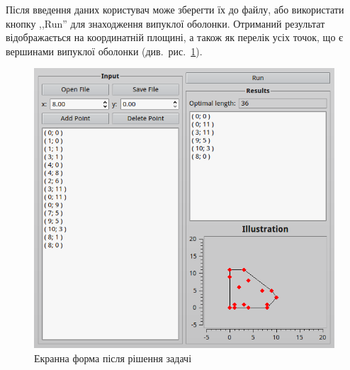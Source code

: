 \documentclass[simple,14pt,utf8,ukrainian]{eskdtext}
\begin{document}
    Після введення даних користувач може зберегти їх до файлу, або використати
    кнопку ,,Run'' для знаходження випуклої оболонки.
    Отриманий результат відображається на координатній площині, а також як
    перелік усіх точок, що є вершинами випуклої оболонки
    (див.~рис.~\ref{fig:final}).

    \begin{figure}[h]
      \centering
      \includegraphics[scale=0.7]{scr1.png}
      \caption{Екранна форма після рішення задачі}
      \label{fig:final}
    \end{figure}

    \clearpage
    \newpage
\end{document}
